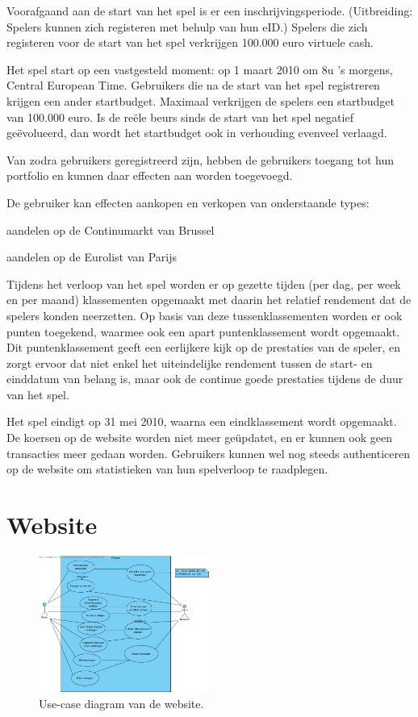 Voorafgaand aan de start van het spel is er een inschrijvingsperiode. (Uitbreiding: Spelers kunnen zich registeren met behulp van hun eID.) Spelers die zich registeren voor de start van het spel verkrijgen 100.000 euro virtuele cash.

Het spel start op een vastgesteld moment: op 1 maart 2010 om 8u 's morgens, Central European Time. Gebruikers die na de start van het spel registreren krijgen een ander startbudget. Maximaal verkrijgen de spelers een startbudget van 100.000 euro. Is de re\"ele beurs sinds de start van het spel negatief ge\"evolueerd, dan wordt het startbudget ook in verhouding evenveel verlaagd.

Van zodra gebruikers geregistreerd zijn, hebben de gebruikers toegang tot hun portfolio en kunnen daar effecten aan worden toegevoegd.

De gebruiker kan effecten aankopen en verkopen van onderstaande types:
\begin{itemize_compact}
	\item{aandelen op de Continumarkt van Brussel}
	\item{aandelen op de Eurolist van Parijs}
\end{itemize_compact}

Tijdens het verloop van het spel worden er op gezette tijden (per dag, per week en per maand) klassementen opgemaakt met daarin het relatief rendement dat de spelers konden neerzetten. Op basis van deze tussenklassementen worden er ook punten toegekend, waarmee ook een apart puntenklassement wordt opgemaakt. Dit puntenklassement geeft een eerlijkere kijk op de prestaties van de speler, en zorgt ervoor dat niet enkel het uiteindelijke rendement tussen de start- en einddatum van belang is, maar ook de continue goede prestaties tijdens de duur van het spel.

Het spel eindigt op 31 mei 2010, waarna een eindklassement wordt opgemaakt. De koersen op de website worden niet meer ge\"updatet, en er kunnen ook geen transacties meer gedaan worden. Gebruikers kunnen wel nog steeds authenticeren op de website om statistieken van hun spelverloop te raadplegen.


\section{Website}

\begin{figure}[h!]
	\centering
		\includegraphics[width=0.5\textwidth]{images/analyse/ucd_website}
	\caption{Use-case diagram van de website.}
\end{figure}

